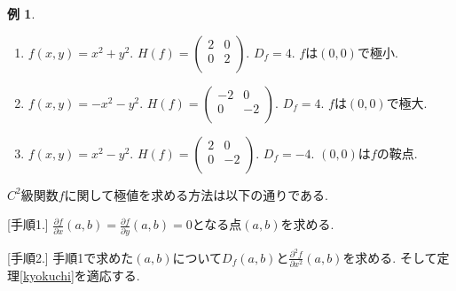 \documentclass[dvipdfmx,a4paper,11pt]{article}
\theoremstyle{definition}
\newtheorem{exa}[thm]{例}
\newcommand{\pdrv}[2]{\frac{\partial #1}{\partial #2}}
\begin{document}
\begin{exa}
\begin{enumerate}
  \setlength{\parskip}{0cm} 
  \setlength{\itemsep}{0cm}
\item $f(x,y)=x^2 + y^2$. 
$H(f) = \left(\begin{array}{cc} 2& 0\\ 
0& 2 \\ \end{array} \right)$.
$D_f =4$.
$f$は$(0,0)$で極小.

\item $f(x,y)=-x^2 - y^2$.
$H(f) = \left(\begin{array}{cc} -2& 0\\ 
0& -2 \\ \end{array} \right)$.
$D_f =4$.
$f$は$(0,0)$で極大.

\item $f(x,y)=x^2 -y^2$.
$H(f) = \left(\begin{array}{cc} 2& 0\\ 
0& -2 \\ \end{array} \right)$.
$D_f =-4$.
$(0,0)$は$f$の鞍点.

\end{enumerate}

\end{exa}

    
    
 \begin{tcolorbox}[
    colback = white,
    colframe = green!35!black,
    fonttitle = \bfseries,
    breakable = true]
    
$C^2$級関数$f$に関して極値を求める方法は以下の通りである.

 \begin{description}
 
\item{[手順1.]} $\pdrv{f}{x}(a,b) = \pdrv{f}{y}(a,b) = 0$となる点$(a,b)$を求める.

\item{[手順2.]} 手順1で求めた$(a,b)$について$D_f(a,b)$と$\pdrv{^2f}{x^2}(a,b) $を求める.
そして定理\ref{kyokuchi}を適応する.

 \end{description}
    \end{tcolorbox}
    
\end{document}
